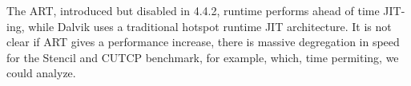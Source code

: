 The ART, introduced but disabled in 4.4.2, runtime performs ahead of
  time JIT-ing, while Dalvik uses a traditional hotspot runtime JIT architecture.
It is not clear if ART gives a performance increase, there is massive degregation
  in speed for the Stencil and CUTCP benchmark, for example, which, time permiting, we could
  analyze.

\begin{figure}%
    \centering
    ~
    \\
    ~
    \\

\end{figure}

